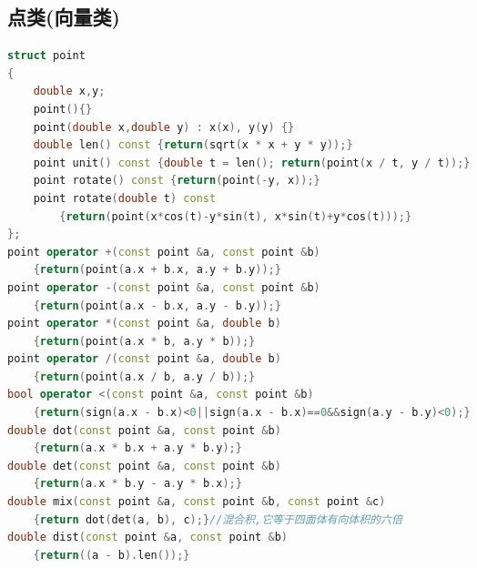 \documentclass[landscape,a4paper]{article}
\begin{document}
\begin{spacing}{0.3}
\begin{multicols}{2}
\subsection{点类(向量类)}
\begin{lstlisting}[language=C++]
struct point
{
	double x,y;
	point(){}
	point(double x,double y) : x(x), y(y) {}
	double len() const {return(sqrt(x * x + y * y));}
	point unit() const {double t = len(); return(point(x / t, y / t));}
	point rotate() const {return(point(-y, x));}
	point rotate(double t) const
        {return(point(x*cos(t)-y*sin(t), x*sin(t)+y*cos(t)));}
};
point operator +(const point &a, const point &b)
    {return(point(a.x + b.x, a.y + b.y));}
point operator -(const point &a, const point &b)
    {return(point(a.x - b.x, a.y - b.y));}
point operator *(const point &a, double b)
    {return(point(a.x * b, a.y * b));}
point operator /(const point &a, double b)
    {return(point(a.x / b, a.y / b));}
bool operator <(const point &a, const point &b)
    {return(sign(a.x - b.x)<0||sign(a.x - b.x)==0&&sign(a.y - b.y)<0);}
double dot(const point &a, const point &b)
    {return(a.x * b.x + a.y * b.y);}
double det(const point &a, const point &b)
    {return(a.x * b.y - a.y * b.x);}
double mix(const point &a, const point &b, const point &c)　
    {return dot(det(a, b), c);}//混合积,它等于四面体有向体积的六倍
double dist(const point &a, const point &b)
    {return((a - b).len());}
\end{lstlisting}

\end{multicols}
\end{spacing}
\end{document}
